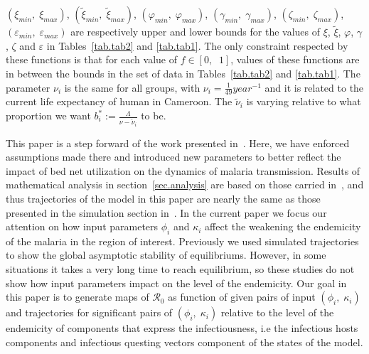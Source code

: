 \documentclass[a4paper]{article}
\begin{document}
$(\xi_{min},\;\xi_{max})$, $(\widetilde\xi_{min},\;\widetilde\xi_{max})$, $(\varphi_{min},\;\varphi_{max})$, $(\gamma_{min},\;\gamma_{max})$, $(\zeta_{min},\;\zeta_{max})$, $(\varepsilon_{min},\;\varepsilon_{max})$ are respectively upper and lower bounds for the values of $\xi$, $\widetilde\xi$, $\varphi$,  $\gamma$, $\zeta$  and $\varepsilon$ in Tables~\ref{tab.tab2} and \ref{tab.tab1}. The only constraint respected by these functions is that for each value of $f\in[0,\;\;1]$,    values of these functions are in between the bounds in the set of data in Tables~\ref{tab.tab2} and \ref{tab.tab1}. The parameter $\nu_i$ is the same for all groups, with $\nu_i=\frac{1}{49} year^{-1}$ and it is related to the current life expectancy of human in Cameroon. The $\widetilde{\nu}_i$ is varying relative to what proportion we want $b^*_i:=\frac{\Lambda}{\nu-\widetilde{\nu}_i}$ to be.

\noindent This paper is a step forward of the work presented in~\cite{jckam201411}. Here, we have enforced assumptions made there and introduced new parameters to better reflect the impact of bed net utilization on the dynamics of malaria transmission. Results of mathematical analysis in section~\ref{sec.analysis} are based on those carried in~\cite{jckam201411}, and thus trajectories of the model in this paper are nearly the same as those presented in the simulation section in~\cite{jckam201411}. In the current paper we focus our attention on how input parameters $\phi_i$ and $\kappa_i$ affect the weakening the endemicity of the malaria in the region of interest.  Previously we used simulated trajectories to show the global asymptotic stability of equilibriums. However,  in some situations it takes a very long time to reach equilibrium, so these studies do not show how input parameters impact on the level of the endemicity. Our goal in this paper is to generate maps of $\mathcal R_0$ as function of given pairs of input $(\phi_i,\;\kappa_i)$ and trajectories for significant pairs of $(\phi_i,\;\kappa_i)$ relative to the level of the endemicity of components  that express the infectiousness, i.e the infectious hosts components and infectious questing vectors component of the states of the model. %
\end{document}
